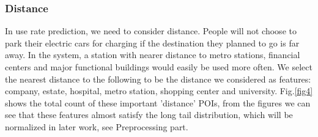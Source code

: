 \subsubsection{Distance}

In use rate prediction, we need to consider distance. People will not choose to park their electric cars for charging if the destination they planned to go is far away. In the system, a station with nearer distance to metro stations, financial centers and major functional buildings would easily be used more often. We select the nearest distance to the following to be the distance we considered as features: company, estate, hospital, metro station, shopping center and university. Fig.\ref{fig4} shows the total count of these important 'distance' POIs, from the figures we can see that these features almost satisfy the long tail distribution, which will be normalized in later work, see Preprocessing part.

